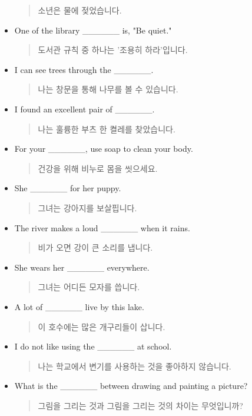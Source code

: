 \documentclass{article}
\begin{document}
\begin{addmargin}[1em]{1em}
\begin{itemize}
    \begin{quote}
    소년은 물에 젖었습니다.
    \end{quote}
    \item One of the library \_\_\_\_\_\_ is, "Be quiet."
    \begin{quote}
    도서관 규칙 중 하나는 '조용히 하라'입니다.
    \end{quote}
    \item I can see trees through the \_\_\_\_\_\_.
    \begin{quote}
    나는 창문을 통해 나무를 볼 수 있습니다.
    \end{quote}
    \item I found an excellent pair of \_\_\_\_\_\_.
    \begin{quote}
    나는 훌륭한 부츠 한 켤레를 찾았습니다.
    \end{quote}
    \item For your \_\_\_\_\_\_, use soap to clean your body.
    \begin{quote}
    건강을 위해 비누로 몸을 씻으세요.
    \end{quote}
    \item She \_\_\_\_\_\_ for her puppy.
    \begin{quote}
    그녀는 강아지를 보살핍니다.
    \end{quote}
    \item The river makes a loud \_\_\_\_\_\_ when it rains.
    \begin{quote}
    비가 오면 강이 큰 소리를 냅니다.
    \end{quote}
    \item She wears her \_\_\_\_\_\_ everywhere.
    \begin{quote}
    그녀는 어디든 모자를 씁니다.
    \end{quote}
    \item A lot of \_\_\_\_\_\_ live by this lake.
    \begin{quote}
    이 호수에는 많은 개구리들이 삽니다.
    \end{quote}
    \item I do not like using the \_\_\_\_\_\_ at school.
    \begin{quote}
    나는 학교에서 변기를 사용하는 것을 좋아하지 않습니다.
    \end{quote}
    \item What is the \_\_\_\_\_\_ between drawing and painting a picture?
    \begin{quote}
    그림을 그리는 것과 그림을 그리는 것의 차이는 무엇입니까?

\end{quote}
\end{itemize}
\end{addmargin}
\end{document}
